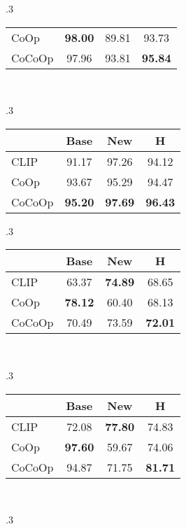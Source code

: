 \documentclass[10pt,twocolumn,letterpaper]{article}
\begin{document}
\begin{table*}[t]
\begin{subtable}[t]{.3\textwidth}
\begin{tabular}{l cc|c}
    CoOp & \textbf{98.00} & 89.81 & 93.73 \\
    \rowcolor{tabhighlight}
    CoCoOp & 97.96 & 93.81 & \textbf{95.84} \\
    \bottomrule
    \end{tabular}
    \end{subtable}
    ~
    \begin{subtable}[t]{.3\textwidth}
    \centering
    \caption{OxfordPets.}
    \begin{tabular}{l cc|c}
    \toprule
    & Base & New & H \\
    \midrule
    CLIP & 91.17 & 97.26 & 94.12 \\
    CoOp & 93.67 & 95.29 & 94.47 \\
    \rowcolor{tabhighlight}
    CoCoOp & \textbf{95.20} & \textbf{97.69} & \textbf{96.43} \\
    \bottomrule
    \end{tabular}
    \end{subtable}
    \vspace{1em}
    \begin{subtable}[t]{.3\textwidth}
    \centering
    \caption{StanfordCars.}
    \begin{tabular}{l cc|c}
    \toprule
    & Base & New & H \\
    \midrule
    CLIP & 63.37 & \textbf{74.89} & 68.65 \\
    CoOp & \textbf{78.12} & 60.40 & 68.13 \\
    \rowcolor{tabhighlight}
    CoCoOp & 70.49 & 73.59 & \textbf{72.01} \\
    \bottomrule
    \end{tabular}
    \end{subtable}
    ~
    \begin{subtable}[t]{.3\textwidth}
    \centering
    \caption{Flowers102.}
    \begin{tabular}{l cc|c}
    \toprule
    & Base & New & H \\
    \midrule
    CLIP & 72.08 & \textbf{77.80} & 74.83 \\
    CoOp & \textbf{97.60} & 59.67 & 74.06 \\
    \rowcolor{tabhighlight}
    CoCoOp & 94.87 & 71.75 & \textbf{81.71} \\
    \bottomrule
    \end{tabular}
    \end{subtable}
    ~
    \begin{subtable}[t]{.3\textwidth}
    \centering
    \caption{Food101.}

\end{subtable}
\end{table*}
\end{document}
